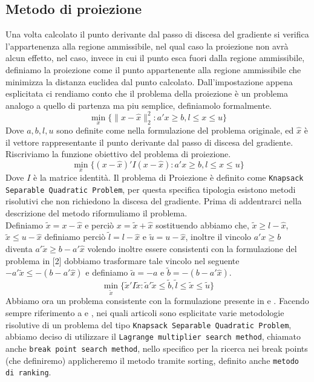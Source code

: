 \documentclass[12pt]{extarticle}
\begin{document}
\subsection{Metodo di proiezione}
Una volta calcolato il punto derivante dal passo di discesa del gradiente si verifica l'appartenenza alla regione ammissibile, nel qual caso la proiezione non avrà alcun effetto, nel caso, invece in cui il punto esca fuori dalla regione ammissibile, definiamo la proiezione come il punto appartenente alla regione ammissibile che minimizza la distanza euclidea dal punto calcolato. Dall'impostazione appena esplicitata ci rendiamo conto che il problema della proiezione è un problema analogo a quello di partenza ma piu semplice, definiamolo formalmente.
\[\min_{x} \{\|x - \hat{x} \|_2^2 : a'x \geq b, l \leq x \leq u \}\]
Dove $a, b, l, u$ sono definite come nella formulazione del problema originale, ed $\hat{x}$ è il vettore rappresentante il punto derivante dal passo di discesa del gradiente.\\
Riscriviamo la funzione obiettivo del problema di proiezione.
\[\min_x \{(x - \hat{x})'I(x - \hat{x}) : a'x \geq b, l \leq x \leq u \}\]
Dove $I$ è la matrice identità. Il problema di Proiezione è definito come \texttt{Knapsack Separable Quadratic Problem}, per questa specifica tipologia esistono metodi risolutivi che non richiedono la discesa del gradiente. Prima di addentrarci nella descrizione del metodo riformuliamo il problema.\\
Definiamo $\widetilde{x} = x - \hat{x}$ e perciò $x = \widetilde{x} + \hat{x}$ sostituendo abbiamo che, $\widetilde{x} \geq l - \hat{x}$, $\widetilde{x} \leq u - \hat{x}$ definiamo perciò $\widetilde{l} = l - \hat{x}$ e $\widetilde{u} = u - \hat{x}$, inoltre il vincolo $a'x \geq b$ diventa $a'\widetilde{x} \geq b - a'\hat{x}$ volendo inoltre essere consistenti con la formulazione del problema in [2] dobbiamo trasformare tale vincolo nel seguente $-a'\widetilde{x} \leq -(b - a'\hat{x})$ e definiamo $\widetilde{a} = -a$ e $\widetilde{b} = -(b - a'\hat{x})$.
\[\min_{\widetilde{x}} \{\widetilde{x}'I\widetilde{x} : \widetilde{a}'\widetilde{x} \leq \widetilde{b}, \widetilde{l} \leq \widetilde{x} \leq \widetilde{u} \}\]
Abbiamo ora un problema consistente con la formulazione presente in \cite{Jeong2014IndefiniteKS} e \cite{PATRIKSSON20081}. Facendo sempre riferimento a \cite{Jeong2014IndefiniteKS} e \cite{PATRIKSSON20081}, nei quali articoli sono esplicitate varie metodologie risolutive di un problema del tipo \texttt{Knapsack Separable Quadratic Problem}, abbiamo deciso di utilizzare il \texttt{Lagrange multiplier search method}, chiamato anche \texttt{break point search method}, nello specifico per la ricerca nei break points (che definiremo) applicheremo il metodo tramite sorting, definito anche \texttt{metodo di ranking}.\\
\end{document}
